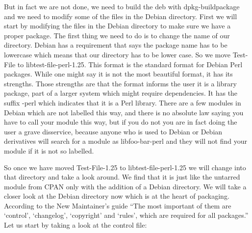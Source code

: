 But in fact we are not done, we need to build the deb with dpkg-buildpackage and
we need to modify some of the f\hbox{}iles in the Debian directory. F\hbox{}irst we will start
by modifying the f\hbox{}iles in the Debian directory to make sure we have a proper
package. The f\hbox{}irst thing we need to do is to change the name of our directory.
Debian has  a requirement that says the package name has to be lowercase which
means that our directory has to be lower case. So we move Test-F\hbox{}ile to
libtest-f\hbox{}ile-perl-1.25. This format is the standard format for Debian Perl
packages. While one might say it is not the most beautiful format, it has its
strengths. Those strengths are that the format informs the user it is a library
package, part of a larger system which might require dependencies. It has the
suf\hbox{}f\hbox{}ix -perl which indicates that it is a Perl library. There are a few modules
in Debian which are not labelled this way, and there is no absolute law saying
you have to call your module this way, but if you do not you are in fact doing
the user a grave disservice, because anyone who is used to Debian or Debian
derivatives will search for a module as libfoo-bar-perl and they will not f\hbox{}ind
your module if it is not so labelled. 

So once we have moved Test-F\hbox{}ile-1.25 to libtest-f\hbox{}ile-perl-1.25 we will change
into that directory and take a look around. We f\hbox{}ind that it is just like the
untarred module from CPAN only with the addition of a Debian directory. We will
take a closer look at the Debian directory now which is at the heart of
packaging. According to the New Maintainer's
guide\cite{debs_cpan-new_maint_guide} ``The most important of them are
`control', `changelog', `copyright' and `rules', which are required for all
packages.'' Let us start by taking a look at the control f\hbox{}ile: 


